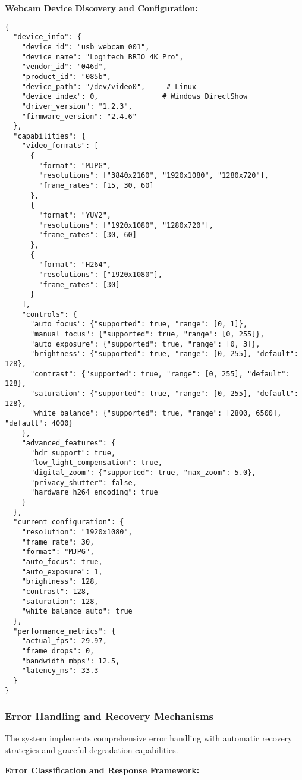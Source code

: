 \documentclass[12pt,a4paper]{article}
\begin{document}
\textbf{Webcam Device Discovery and Configuration:}

\begin{verbatim}
{
  "device_info": {
    "device_id": "usb_webcam_001",
    "device_name": "Logitech BRIO 4K Pro",
    "vendor_id": "046d",
    "product_id": "085b",
    "device_path": "/dev/video0",     # Linux
    "device_index": 0,               # Windows DirectShow
    "driver_version": "1.2.3",
    "firmware_version": "2.4.6"
  },
  "capabilities": {
    "video_formats": [
      {
        "format": "MJPG",
        "resolutions": ["3840x2160", "1920x1080", "1280x720"],
        "frame_rates": [15, 30, 60]
      },
      {
        "format": "YUV2", 
        "resolutions": ["1920x1080", "1280x720"],
        "frame_rates": [30, 60]
      },
      {
        "format": "H264",
        "resolutions": ["1920x1080"],
        "frame_rates": [30]
      }
    ],
    "controls": {
      "auto_focus": {"supported": true, "range": [0, 1]},
      "manual_focus": {"supported": true, "range": [0, 255]},
      "auto_exposure": {"supported": true, "range": [0, 3]},
      "brightness": {"supported": true, "range": [0, 255], "default": 128},
      "contrast": {"supported": true, "range": [0, 255], "default": 128},
      "saturation": {"supported": true, "range": [0, 255], "default": 128},
      "white_balance": {"supported": true, "range": [2800, 6500], "default": 4000}
    },
    "advanced_features": {
      "hdr_support": true,
      "low_light_compensation": true,
      "digital_zoom": {"supported": true, "max_zoom": 5.0},
      "privacy_shutter": false,
      "hardware_h264_encoding": true
    }
  },
  "current_configuration": {
    "resolution": "1920x1080",
    "frame_rate": 30,
    "format": "MJPG",
    "auto_focus": true,
    "auto_exposure": 1,
    "brightness": 128,
    "contrast": 128,
    "saturation": 128,
    "white_balance_auto": true
  },
  "performance_metrics": {
    "actual_fps": 29.97,
    "frame_drops": 0,
    "bandwidth_mbps": 12.5,
    "latency_ms": 33.3
  }
}
\end{verbatim}

\subsubsection{Error Handling and Recovery Mechanisms}

The system implements comprehensive error handling with automatic recovery strategies and graceful degradation
capabilities.

\textbf{Error Classification and Response Framework:}
\end{document}
